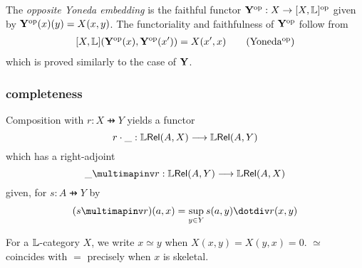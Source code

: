 \begin{remark}
The \emph{opposite Yoneda embedding} is the faithful functor
$\mathbf{Y}^{\mathrm{op}}: X\to [X,\mathbb{L}]^{\mathrm{op}}$ given by $\mathbf{Y}^{\mathrm{op}}(x)(y)=X(x,y)$. The functoriality and faithfulness of $\mathbf{Y}^{\mathrm{op}}$ follow from
\begin{align}\label{eq:yonedaop}
[X,\Lawv](\B Y^{\mathrm{op}}(x),\B Y^{\mathrm{op}}(x'))= X(x',x) \tag{Yoneda$^{\mathrm{op}}$}
\end{align}
which is proved similarly to the case of $\mathbf{Y}$.
\end{remark}

\subsubsection{completeness}






Composition with $r:X\pfun Y$ yields a functor
$$
r\cdot \_ : \mathbb{L} \mathsf{Rel}(A,X)   \longrightarrow \mathbb{L} \mathsf{Rel}(A,Y)
$$
which
has a right-adjoint
$$
\_ \multimapinv r : \LREL(A,Y)   \longrightarrow \LREL(A,X)
$$
given, for $s:A\pfun Y$ by 
\begin{align*}
(s\multimapinv r)(a,x)= \sup_{y\in Y}s(a,y) \dotdiv r(x,y)
\end{align*}




%
%
%
%
%
%
%
%
%

For a $\mathbb{L}$-category $X$, we write $x\simeq y$ when $X(x,y)=X(y,x)=0$. $\simeq$ coincides with $=$ precisely when $x$ is skeletal.

